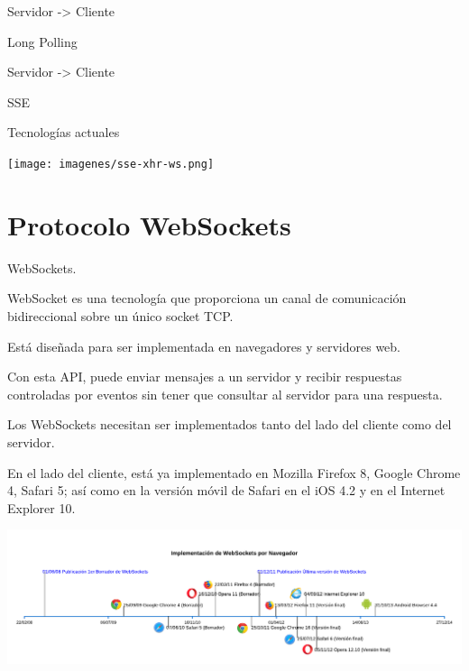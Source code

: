 \documentclass[usenames,dvipsnames]{beamer}
\begin{document}
\begin{frame}{Servidor -> Cliente}

	\begin{center}
	\huge{Long Polling}
	\end{center}
	
\end{frame}

\begin{frame}{Servidor -> Cliente}

	\begin{center}
	\huge{SSE}
	\end{center}
	
\end{frame}

\begin{frame}{Tecnologías actuales}

	\begin{center}
	\texttt{[image: imagenes/sse-xhr-ws.png]}
	\end{center}
	
\end{frame}




\section{Protocolo WebSockets} %
\begin{frame}{WebSockets. }

WebSocket es una tecnología que proporciona un canal de comunicación bidireccional sobre un único socket TCP.

Está diseñada para ser implementada en navegadores y servidores web.

Con esta API, puede enviar mensajes a un servidor y recibir respuestas controladas por eventos sin tener que consultar al servidor para una respuesta.

\end{frame}

\begin{frame}

Los WebSockets necesitan ser implementados tanto del lado del cliente como del servidor.

En el lado del cliente, está ya implementado en Mozilla Firefox 8, Google Chrome 4, Safari 5; así como en la versión móvil de Safari en el iOS 4.2 y en el Internet Explorer 10.

\centering
\includegraphics[scale=0.35]{imagenes/timeline.pdf}

\end{frame}
\end{document}
